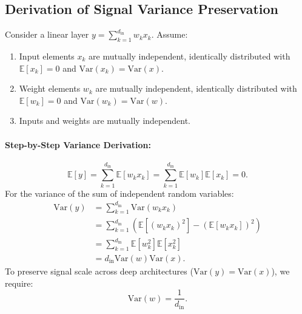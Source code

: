 \documentclass[11pt]{article}
\begin{document}
\subsection{Derivation of Signal Variance Preservation}
Consider a linear layer $y = \sum_{k=1}^{d_{\text{in}}} w_k x_k$. Assume:
\begin{enumerate}
    \item Input elements $x_k$ are mutually independent, identically distributed with $\mathbb{E}[x_k] = 0$ and $\text{Var}(x_k) = \text{Var}(x)$.
    \item Weight elements $w_k$ are mutually independent, identically distributed with $\mathbb{E}[w_k] = 0$ and $\text{Var}(w_k) = \text{Var}(w)$.
    \item Inputs and weights are mutually independent.
\end{enumerate}

\paragraph{Step-by-Step Variance Derivation:}
\begin{equation}
\mathbb{E}[y] = \sum_{k=1}^{d_{\text{in}}} \mathbb{E}[w_k x_k] = \sum_{k=1}^{d_{\text{in}}} \mathbb{E}[w_k] \mathbb{E}[x_k] = 0.
\end{equation}
For the variance of the sum of independent random variables:
\begin{align}
\text{Var}(y) &= \sum_{k=1}^{d_{\text{in}}} \text{Var}(w_k x_k) \nonumber \\
&= \sum_{k=1}^{d_{\text{in}}} \left( \mathbb{E}[(w_k x_k)^2] - (\mathbb{E}[w_k x_k])^2 \right) \nonumber \\
&= \sum_{k=1}^{d_{\text{in}}} \mathbb{E}[w_k^2] \mathbb{E}[x_k^2] \nonumber \\
&= d_{\text{in}} \text{Var}(w) \text{Var}(x). \label{eq:var_forward}
\end{align}
To preserve signal scale across deep architectures ($\text{Var}(y) = \text{Var}(x)$), we require:
\begin{equation}
\text{Var}(w) = \frac{1}{d_{\text{in}}}.
\end{equation}
\end{document}
